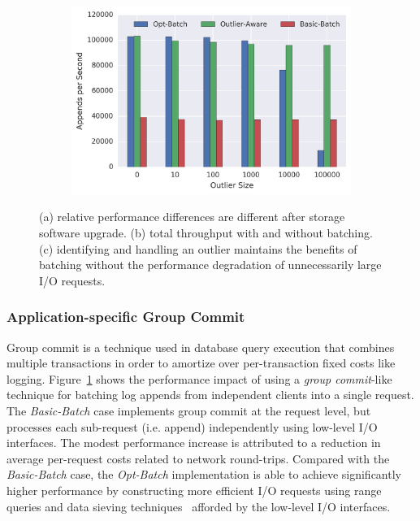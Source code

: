 \begin{figure}[t]
\begin{subfigure}[b]{.30\linewidth}
        \caption{}
        \label{fig:batching}
    \end{subfigure}
    \begin{subfigure}[b]{.30\linewidth}
        \centering
        \includegraphics[width=1.0\linewidth]{batching-outlier-detect.png}
        \caption{}
        \label{fig:batching-outlier}
    \end{subfigure}
    \caption{(a) relative performance differences are different after storage
    software upgrade. (b) total throughput with and without batching. (c)
    identifying and handling an outlier maintains the benefits
    of batching without the performance degradation of unnecessarily large I/O
    requests.}
\end{figure}

\subsubsection{Application-specific Group Commit}
\label{sec:batch}

Group commit is a technique used in database query execution that combines
multiple transactions in order to amortize over per-transaction fixed costs
like logging. Figure~\ref{fig:batching} shows the performance impact of using
a \emph{group commit}-like technique for batching log appends from independent
clients into a single request. The \emph{Basic-Batch} case implements group
commit at the request level, but processes each sub-request (i.e. append)
independently using low-level I/O interfaces. The modest performance increase
is attributed to a reduction in average per-request costs related to network
round-trips. Compared with the \emph{Basic-Batch} case, the \emph{Opt-Batch}
implementation is able to achieve significantly higher performance by
constructing more efficient I/O requests using range queries and data sieving
techniques~\cite{750599} afforded by the low-level I/O interfaces.

